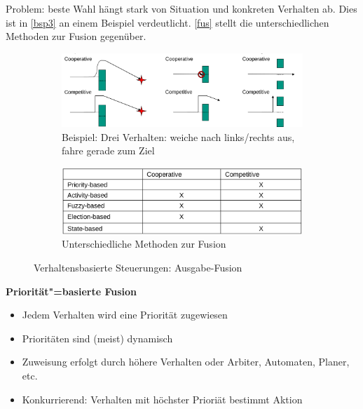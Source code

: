 Problem: beste Wahl hängt stark von Situation und konkreten Verhalten ab. Dies ist in \autoref{bsp3} an einem Beispiel verdeutlicht.
\autoref{fus} stellt die unterschiedlichen Methoden zur Fusion gegenüber.\\
\begin{figure}
	\centering
	\begin{subfigure}{.8\textwidth}
		\centering
		\includegraphics[width=\textwidth]{figures/fusion_beispiel.png}
		\caption{Beispiel: Drei Verhalten: weiche nach links/rechts aus, fahre gerade zum Ziel}
		\label{bsp3}
	\end{subfigure}\par\medskip
	\begin{subfigure}{.8\textwidth}
		\centering
		\includegraphics[width=\textwidth]{figures/fusion_methoden.png}
		\caption{Unterschiedliche Methoden zur Fusion}
		\label{fus}
	\end{subfigure}
	\caption{Verhaltensbasierte Steuerungen: Ausgabe-Fusion}
\end{figure}
\textbf{Priorität"=basierte Fusion}
\begin{itemize}
	\item Jedem Verhalten wird eine Priorität zugewiesen
	\item Prioritäten sind (meist) dynamisch
	\item Zuweisung erfolgt durch höhere Verhalten oder Arbiter, Automaten, Planer, etc.
	\item Konkurrierend: Verhalten mit höchster Prioriät bestimmt Aktion
\end{itemize}

